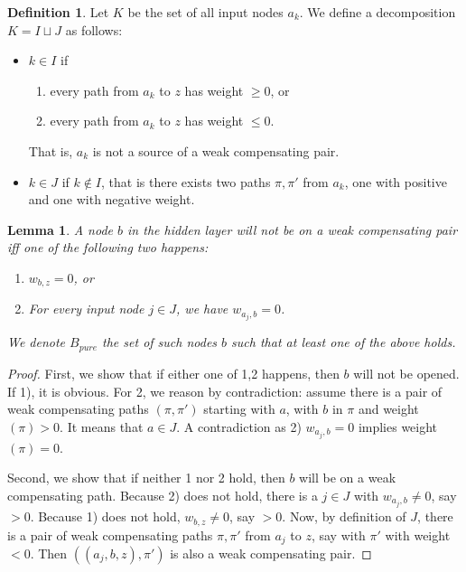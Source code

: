 \documentclass[]{article}
\newtheorem{lemma}{Lemma}
\theoremstyle{definition}
\newtheorem{definition}{Definition}
\begin{document}
\begin{definition}
	Let $K$ be the set of all input nodes $a_k$. 
	We define a decomposition $K=I\sqcup J$ as follows:  
	\begin{itemize}
		\item $k \in I$  if
		\begin{enumerate}
			\item every path from $a_k$ to $z$ has weight $\geq 0$, or
			\item every path from $a_k$ to $z$ has weight $\leq 0$.
		\end{enumerate}
		That is, $a_k$ is not a source of a weak compensating pair.
		\item $k \in J$ if $k \notin I$, that is there exists two paths $\pi,\pi'$ from $a_k$, 
		one with positive and one with negative weight.
	\end{itemize}
\end{definition} 



\begin{lemma} \label{lem:open_node_2}
	A node $b$ in the hidden layer will not be on a weak compensating pair iff one of the following two happens:
	\begin{enumerate}
		\item $w_{b,z}=0$, or
		\item For every input node $j\in J$, we have $w_{a_j,b}=0$.
	\end{enumerate}
	We denote $B_{pure}$ the set of such nodes $b$ such that at least one of the above holds.
\end{lemma}

\begin{proof}
	First, we show that if either one of 1,2 happens, then $b$ will not be opened. If 1), it is obvious. For 2, we reason by contradiction: assume there is a pair of weak compensating paths 	$(\pi,\pi')$ starting with $a$, with $b$ in $\pi$ and weight$(\pi) > 0$. It means that $a \in J$. A contradiction as 2) $w_{a_j,b}=0$ implies weight$(\pi)=0$.
	
	Second, we show that if neither 1 nor 2 hold, then $b$ will be on a weak compensating path.
	Because 2) does not hold, there is a $j \in J$ with $w_{a_j,b} \neq 0$, say $>0$.
	Because 1) does not hold, $w_{b,z} \neq 0$, say $>0$.
	Now, by definition of $J$, there is a pair of weak compensating paths $\pi,\pi'$ 
	from $a_j$ to $z$, say with $\pi'$ with weight $<0$.
	Then $((a_j,b,z), \pi')$ is also a weak compensating pair.
\end{proof}
\end{document}
